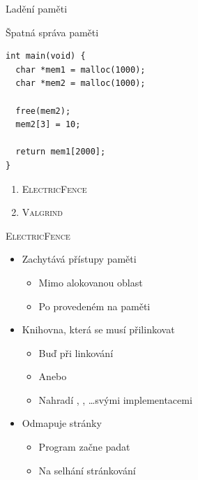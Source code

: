 
\begin{frame}[fragile]{Ladění paměti}

  \begin{block}{Špatná správa paměti}
  \begin{lstlisting}
int main(void) {
  char *mem1 = malloc(1000);
  char *mem2 = malloc(1000);

  free(mem2);
  mem2[3] = 10;

  return mem1[2000];
}
  \end{lstlisting}
  \end{block}

  \pause
  \medskip

  \begin{enumerate}
    \item \textsc{ElectricFence}
    \item \textsc{Valgrind}
  \end{enumerate}

\end{frame}

\begin{frame}{\textsc{ElectricFence}}

  \begin{itemize}
    \item Zachytává přístupy paměti
    \begin{itemize}
      \item Mimo alokovanou oblast
      \item Po provedeném  na paměti
    \end{itemize}

    \pause

    \item Knihovna, která se musí přilinkovat
    \begin{itemize}
      \item Buď  při linkování
      \item Anebo 

      \pause

      \item Nahradí , , \dots svými implementacemi
    \end{itemize}

    \pause

    \item Odmapuje stránky
    \begin{itemize}
      \item Program začne padat
      \item Na selhání stránkování
    \end{itemize}
  \end{itemize}

\end{frame}

